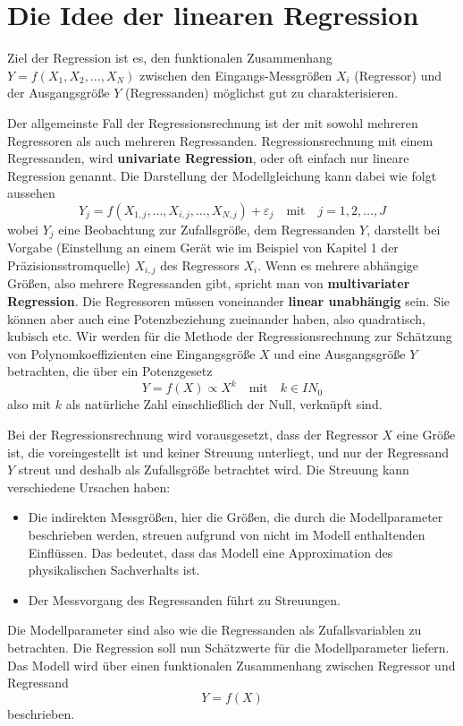 
\section{Die Idee der linearen Regression}
\label{RegressionsIdee}
Ziel der Regression ist es, den funktionalen Zusammenhang $Y =
f(X_{1} ,X_{2} ,...,X_{N} )$ zwischen den
Eingangs-Messgrößen $X_{i}$ (Regressor) und der Ausgangsgröße $Y$
(Regressanden) möglichst gut zu charakterisieren.

Der allgemeinste Fall der Regressionsrechnung ist der mit sowohl mehreren
Regressoren als auch mehreren Regressanden.
Regressionsrechnung mit einem Regressanden, wird \textbf{univariate Regression}, oder oft einfach nur lineare Regression genannt.
Die Darstellung der Modellgleichung kann dabei wie folgt aussehen 
\begin{equation}
Y_j = f(X_{1,j},\dots, X_{i,j},\dots, X_{N,j}) + \varepsilon_j \quad \mathrm{mit} \quad j = 1,2,\ldots,J
\label{Kap2Modellglunivar}
\end{equation}
wobei $Y_j$ eine Beobachtung zur Zufallsgröße, dem Regressanden $Y$, darstellt bei Vorgabe (Einstellung an einem
Gerät wie im Beispiel von Kapitel 1 der Präzisionsstromquelle) $X_{i,j}$ des Regressors $X_i$.
Wenn es mehrere abhängige Größen, also mehrere Regressanden gibt, spricht man von \textbf{multivariater Regression}. Die Regressoren müssen voneinander \textbf{linear unabhängig} sein.
Sie können aber auch eine Potenzbeziehung zueinander haben, also quadratisch, kubisch etc.
Wir werden für die Methode der Regressionsrechnung zur Schätzung von Polynomkoeffizienten
eine Eingangsgröße $X$ und eine Ausgangsgröße $Y$ betrachten, die über ein Potenzgesetz
\begin{equation}
Y = f(X) \propto X^k \quad \mathrm{mit} \quad k \in I \! \! N_0
\label{potenzgesetzlinReg}
\end{equation}
also mit $k$ als natürliche Zahl einschließlich der Null, verknüpft sind.

Bei der Regressionsrechnung wird vorausgesetzt,
dass der Regressor $X$ eine Größe ist, die voreingestellt ist und keiner Streuung unterliegt,
und nur der Regressand $Y$ streut und deshalb als Zufallsgröße betrachtet wird.
Die Streuung kann verschiedene Ursachen haben:
\begin{itemize}
\item Die indirekten Messgrößen, hier die Größen, die durch die
Modellparameter beschrieben werden, streuen aufgrund von nicht im Modell
enthaltenden Einflüssen.
Das bedeutet, dass das Modell eine Approximation des physikalischen Sachverhalts ist.
\item Der Messvorgang des Regressanden führt zu Streuungen.
\end{itemize}
Die Modellparameter sind also wie die Regressanden als Zufallsvariablen
zu betrachten. Die Regression soll nun Schätzwerte für die
Modellparameter liefern. Das Modell wird über einen 
funktionalen Zusammenhang zwischen Regressor und Regressand 
\begin{equation}
Y = f(X)
\label{Kap2Modellgleichung}
\end{equation}
beschrieben.

